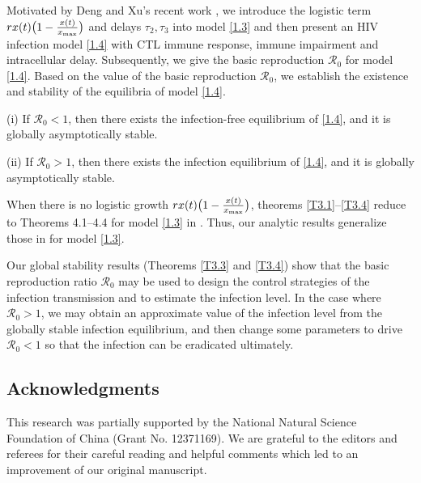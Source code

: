 \documentclass[reqno]{amsart}
\begin{document}
Motivated by Deng and Xu's recent work \cite{DX},
we introduce the logistic term $rx(t)\big(1-\frac{x(t)}{x_{\rm max}}\big)$ and 
delays $\tau_2, \tau_3$ into model \eqref{1.3} and then  present an  HIV infection 
model \eqref{1.4} with CTL immune response, immune impairment and  intracellular delay.  
Subsequently, we give the basic reproduction $\mathcal{R}_0$ for model \eqref{1.4}. 
Based on the value of the basic reproduction $\mathcal{R}_0$, we establish the 
existence and stability of the equilibria of model \eqref{1.4}.

(i) If  $\mathcal{R}_0<1$, then there exists the infection-free equilibrium of 
 \eqref{1.4}, and it is globally asymptotically stable.

(ii) If  $\mathcal{R}_0>1$,  then there exists the infection equilibrium of 
 \eqref{1.4}, and it is globally asymptotically stable.

When there is no logistic growth 
$rx(t)\big(1-\frac{x(t)}{x_{\rm max}}\big)$, theorems \ref{T3.1}--\ref{T3.4}
reduce to Theorems 4.1--4.4 for model \eqref{1.3}  in \cite{DX}.
Thus, our analytic results generalize those in \cite{DX} for  model \eqref{1.3}.

Our global stability results (Theorems \ref{T3.3} and \ref{T3.4}) show that the 
basic reproduction ratio $\mathcal{R}_0$ may be used to design the control strategies 
of the infection transmission and to estimate the infection level. 
In the case where $\mathcal{R}_0 > 1$, we may obtain an approximate value of the 
infection level from the globally stable infection equilibrium, and then change
some parameters to drive $\mathcal{R}_0 < 1$ so that the infection can be eradicated
ultimately.


\subsection*{Acknowledgments}
This research was partially supported by the National Natural
Science Foundation of China (Grant No. 12371169).
We are grateful to the editors and referees for their careful reading and helpful 
comments which led to an improvement of our original manuscript.
\end{document}
